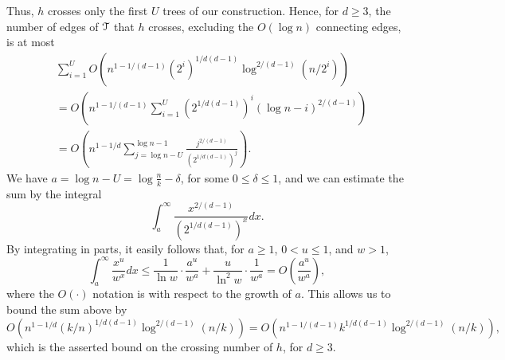 \documentclass[11pt]{article}
\newcommand{\Tree}{\EuScript{T}}
\begin{document}
Thus, $h$ crosses only the first $U$ trees of our construction. Hence, for $d \geq 3$, the number of edges of $\Tree$ that $h$ crosses, excluding the $O(\log n)$ connecting edges, is at most
\begin{align*}
& \sum_{i=1}^{U} O\left(n^{1-1/(d-1)}(2^{i})^{1/d(d-1)} \log^{2/(d-1)}(n/2^{i})\right) \\
& = O\left(n^{1-1/(d-1)}\sum_{i=1}^{U}\left(2^{1/d(d-1)}\right)^{i}(\log n - i)^{2/(d-1)}\right) \\
& = O\left(n^{1-1/d}\sum_{j=\log n - U}^{\log n - 1}\frac{j^{2/(d-1)}}{\left(2^{1/d(d-1)}\right)^{j}}\right).
\end{align*}
We have $a = \log n - U = \log\frac{n}{k}-\delta$, for some $0 \leq \delta \leq 1$, and we can estimate the sum by the integral
$$
\int_{a}^{\infty} \frac{x^{2/(d-1)}}{(2^{1/d(d-1)})^{x}} dx.
$$
By integrating in parts, it easily follows that, for $a \geq 1$, $0 < u \leq 1$, and $w > 1$,
\begin{equation} \label{eq_integral}
\int_{a}^{\infty}\frac{x^{u}}{w^{x}}dx \leq \frac{1}{\ln w} \cdot \frac{a^{u}}{w^{a}} + \frac{u}{\ln^{2}w} \cdot \frac{1}{w^{a}} = O\left(\frac{a^{u}}{w^{a}}\right),
\end{equation}
where the $O(\cdot)$ notation is with respect to the growth of $a$. This allows us to bound the sum above by
$$
O\left(n^{1-1/d}(k/n)^{1/d(d-1)} \log^{2/(d-1)}(n/k) \right) = O\left(n^{1-1/(d-1)}k^{1/d(d-1)} \log^{2/(d-1)}(n/k) \right),
$$
which is the asserted bound on the crossing number of $h$, for $d \geq 3$.
\end{document}
